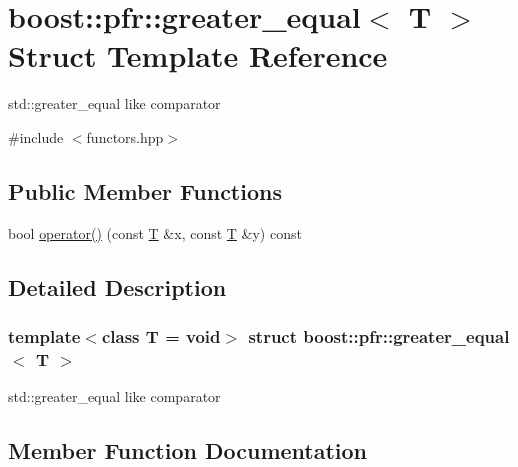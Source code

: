\hypertarget{structboost_1_1pfr_1_1greater__equal}{}\section{boost\+:\+:pfr\+:\+:greater\+\_\+equal$<$ T $>$ Struct Template Reference}
\label{structboost_1_1pfr_1_1greater__equal}


std\+::greater\+\_\+equal like comparator  




{\ttfamily \#include $<$functors.\+hpp$>$}

\subsection*{Public Member Functions}
\begin{DoxyCompactItemize}
\item 
bool \mbox{\hyperlink{structboost_1_1pfr_1_1greater__equal_a3d377fda4d1010a70b1b47aadfeb67a9}{operator()}} (const \mbox{\hyperlink{struct_t}{T}} \&x, const \mbox{\hyperlink{struct_t}{T}} \&y) const
\end{DoxyCompactItemize}


\subsection{Detailed Description}
\subsubsection*{template$<$class T = void$>$\newline
struct boost\+::pfr\+::greater\+\_\+equal$<$ T $>$}

std\+::greater\+\_\+equal like comparator 

\subsection{Member Function Documentation}
\mbox{\label{structboost_1_1pfr_1_1greater__equal_a3d377fda4d1010a70b1b47aadfeb67a9}} 
